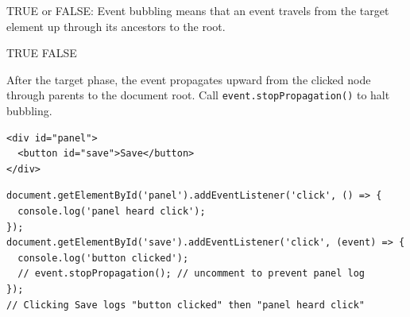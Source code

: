 \question[4]
TRUE or FALSE: Event bubbling means that an event travels from the target element up through its ancestors to the root.
\begin{choices}
  \CorrectChoice TRUE
  \choice FALSE
\end{choices}
\begin{solution}
  After the target phase, the event propagates upward from the clicked node through parents to the document root. Call \lstinline[style=jsinline]|event.stopPropagation()| to halt bubbling.
\begin{lstlisting}[style=htmlinline]
<div id="panel">
  <button id="save">Save</button>
</div>
\end{lstlisting}
\begin{lstlisting}[style=js]
document.getElementById('panel').addEventListener('click', () => {
  console.log('panel heard click');
});
document.getElementById('save').addEventListener('click', (event) => {
  console.log('button clicked');
  // event.stopPropagation(); // uncomment to prevent panel log
});
// Clicking Save logs "button clicked" then "panel heard click"
\end{lstlisting}
\end{solution}
